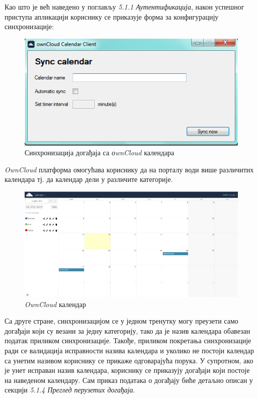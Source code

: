 Као што је већ наведено у поглављу \textit{5.1.1 Аутентификација}, након успешног приступа апликацији кориснику се приказује форма за конфигурацију синхронизације:

\begin{figure}[H]
	\centering
	\includegraphics[scale=0.5]{slike/SyncCalendar.png}
	\caption{Синхронизација догађаја са \textit{оwnCloud} календара}
	\label{fig:sync_calendar}
\end{figure}

\textit{OwnCloud} платформа омогућава кориснику да на порталу води више различитих календара тј. да календар дели у различите категорије. 

\begin{figure}[H]
	\centering
	\includegraphics[scale=0.5]{slike/ownCloudCalendar.png}
	\caption{\textit{OwnCloud} календар}
	\label{fig:own_cloud_calendar}
\end{figure}

Са друге стране, синхронизацијом се у једном тренутку могу преузети само догађаји који су везани за једну категорију, тако да је назив календара обавезан податак приликом синхронизације. Такође, приликом покретања синхронизације ради се валидација исправности назива календара и уколико не постоји календар са унетим називом кориснику се прикаже одговарајућа порука. У супротном, ако је унет исправан назив календара, кориснику се приказују догађаји који постоје на наведеном календару. Сам приказ података о догађају биће детаљно описан у секцији \textit{5.1.4 Преглед перузетих догађаја}.

